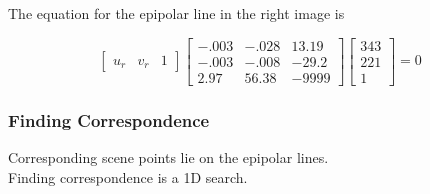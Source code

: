 \begin{frame}
    \vspace{0.5em} %

    The equation for the epipolar line in the right image is

    \begin{equation*}
    \begin{bmatrix} u_r & v_r & 1 \end{bmatrix}
    \begin{bmatrix}
    -.003 & -.028 & 13.19 \\
    -.003 & -.008 & -29.2 \\
    2.97 & 56.38 & -9999
    \end{bmatrix}
    \begin{bmatrix}
    343 \\ 221 \\ 1
    \end{bmatrix} = 0
    \end{equation*}
    
\end{frame}

\begin{frame}
    \frametitle{Finding Correspondence}
    \centering

    \vspace{1cm}
    Corresponding scene points lie on the epipolar lines.
    \\
    Finding correspondence is a 1D search.
\end{frame}

